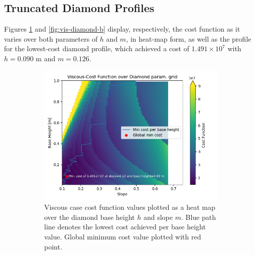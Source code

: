 \documentclass[11pt]{article}
\begin{document}
\subsection{Truncated Diamond Profiles}
Figures \ref{fig:vis-diamond-a} and \ref{fig:vis-diamond-b} display, respectively, the cost function as it varies over both parameters of $h$ and $m$, in heat-map form, as well as the profile for the lowest-cost diamond profile, which achieved a cost of $1.491\times 10^7$ with $h=0.090 \text{ m}$ and $m=0.126$.
\begin{figure}[H]
\centering
\begin{subfigure}[b]{0.54\textwidth}
    \centering
    \includegraphics[width=\linewidth]{../results/viscous/diamonds.png}
    \caption{Viscous case cost function values plotted as a heat map over the diamond base height $h$ and slope $m$. Blue path line denotes the lowest cost achieved per base height value. Global minimum cost value plotted with red point.}
    \label{fig:vis-diamond-a}
\end{subfigure}
\hfill
\begin{subfigure}[b]{0.44\textwidth}
    \centering

\end{subfigure}
\end{figure}
\end{document}
